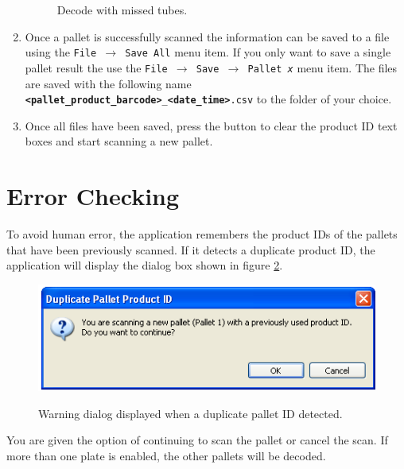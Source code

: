 \begin{enumerate}
\begin{figure}[H]
	   \caption{Decode with missed tubes.}
	   \label{fig:scan_missed_tube}
\end{figure}
\item Once a pallet is successfully scanned the information can be saved to a
  file using the \texttt{File $\to$ Save All} menu item. If you only want to
  save a single pallet result the use the \texttt{File $\to$ Save $\to$ Pallet
    \emph{x}} menu item. The files are saved with the following name
  \texttt{\textbf{<pallet\_product\_barcode>}\_\textbf{<date\_time>}.csv} to
  the folder of your choice.
\item Once all files have been saved, press the  button to
  clear the product ID text boxes and start scanning a new pallet.
\end{enumerate}

\section{Error Checking}
To avoid human error, the application remembers the product IDs of the pallets
that have been previously scanned. If it detects a duplicate product ID, the
application will display the dialog box shown in figure
\ref{fig:duplicate_pallet_id}.
\begin{figure}[H]
  \centering
  \scalebox{0.35}
	   { \includegraphics*{screenshots/scan_and_decode/duplicate_pallet_id_dialog} }
	   \caption{Warning dialog displayed when a duplicate pallet ID detected.}
	   \label{fig:duplicate_pallet_id}
\end{figure}
You are given the option of continuing to scan the pallet or cancel the
scan. If more than one plate is enabled, the other pallets will be decoded.

